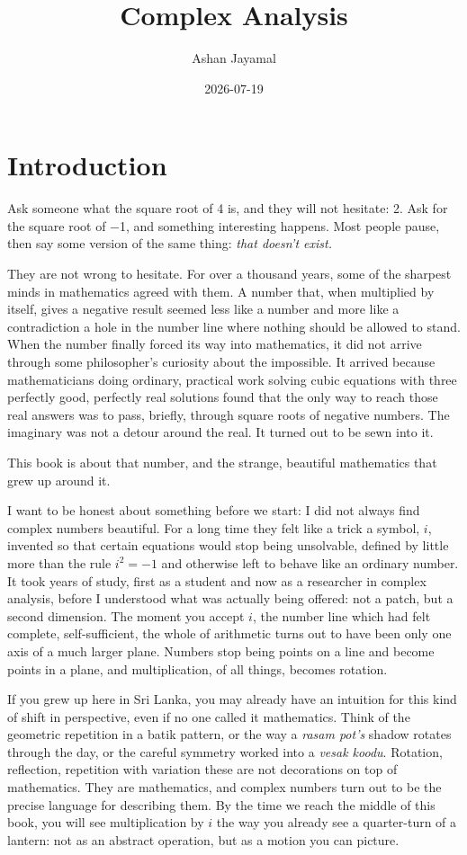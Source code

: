 \documentclass[
]{book}
\title{Complex Analysis}
\author{Ashan Jayamal}
\date{2026-07-19}
\theoremstyle{definition}
\theoremstyle{definition}
\theoremstyle{definition}
\theoremstyle{definition}
\theoremstyle{remark}
\begin{document}
\maketitle

{
\setcounter{tocdepth}{1}
\tableofcontents
}
\chapter{Introduction}\label{introduction}

Ask someone what the square root of 4 is, and they will not hesitate: 2. Ask for the square root of −1, and something interesting happens. Most people pause, then say some version of the same thing: \emph{that doesn't exist.}

They are not wrong to hesitate. For over a thousand years, some of the sharpest minds in mathematics agreed with them. A number that, when multiplied by itself, gives a negative result seemed less like a number and more like a contradiction a hole in the number line where nothing should be allowed to stand. When the number finally forced its way into mathematics, it did not arrive through some philosopher's curiosity about the impossible. It arrived because mathematicians doing ordinary, practical work solving cubic equations with three perfectly good, perfectly real solutions found that the only way to reach those real answers was to pass, briefly, through square roots of negative numbers. The imaginary was not a detour around the real. It turned out to be sewn into it.

This book is about that number, and the strange, beautiful mathematics that grew up around it.

I want to be honest about something before we start: I did not always find complex numbers beautiful. For a long time they felt like a trick a symbol, \(i\), invented so that certain equations would stop being unsolvable, defined by little more than the rule \(i^2 = -1\) and otherwise left to behave like an ordinary number. It took years of study, first as a student and now as a researcher in complex analysis, before I understood what was actually being offered: not a patch, but a second dimension. The moment you accept \(i\), the number line which had felt complete, self-sufficient, the whole of arithmetic turns out to have been only one axis of a much larger plane. Numbers stop being points on a line and become points in a plane, and multiplication, of all things, becomes rotation.

If you grew up here in Sri Lanka, you may already have an intuition for this kind of shift in perspective, even if no one called it mathematics. Think of the geometric repetition in a batik pattern, or the way a \emph{rasam pot's} shadow rotates through the day, or the careful symmetry worked into a \emph{vesak koodu}. Rotation, reflection, repetition with variation these are not decorations on top of mathematics. They are mathematics, and complex numbers turn out to be the precise language for describing them. By the time we reach the middle of this book, you will see multiplication by \(i\) the way you already see a quarter-turn of a lantern: not as an abstract operation, but as a motion you can picture.
\end{document}
